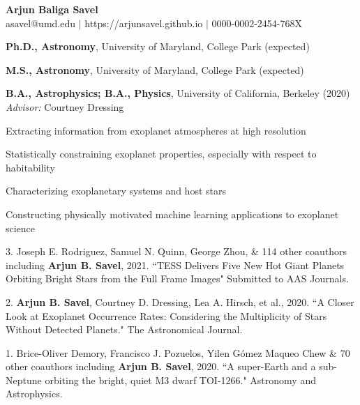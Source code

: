 \documentclass[12pt,letterpaper]{article}
\begin{document}
\thispagestyle{empty}\sloppy\sloppypar\raggedbottom
\centering
\textbf{\Large Arjun Baliga Savel} \hfill \\
\textsf{\small asavel@umd.edu $|$ https://arjunsavel.github.io} $|$ 0000-0002-2454-768X\\
\raggedright

\begin{list}{}{\cvlist}
\item
\textbf{Ph.D., Astronomy}, University of Maryland, College Park (expected)
\item
\textbf{M.S., Astronomy}, University of Maryland, College Park (expected)
\item
\textbf{B.A., Astrophysics; B.A., Physics}, University of California, Berkeley (2020) \\\textit{Advisor:} Courtney Dressing
\end{list}

\begin{list}{}{\cvlist}

\item Extracting information from exoplanet atmospheres at high resolution
\item Statistically constraining exoplanet properties, especially with respect to habitability
\item Characterizing exoplanetary systems and host stars
\item Constructing physically motivated machine learning applications to exoplanet science

\end{list}

\begin{list}{}{\cvlist}

\item 3.  Joseph E. Rodriguez, Samuel N. Quinn, George Zhou, \& 114 other coauthors including \textbf{Arjun B. Savel}, 2021. ``TESS Delivers Five New Hot Giant Planets Orbiting Bright Stars from the Full Frame Images" Submitted to AAS Journals.

\item 2. \textbf{Arjun B. Savel}, Courtney D. Dressing, Lea A. Hirsch, et al., 2020. ``A Closer Look at Exoplanet Occurrence Rates: Considering the Multiplicity of Stars Without Detected Planets." The Astronomical Journal.

\item 1. Brice-Oliver Demory, Francisco J. Pozuelos, Yilen Gómez Maqueo Chew \& 70 other coauthors including \textbf{Arjun B. Savel}, 2020. ``A super-Earth and a sub-Neptune orbiting the bright, quiet M3 dwarf TOI-1266." Astronomy and Astrophysics.
\end{list}
\end{document}
